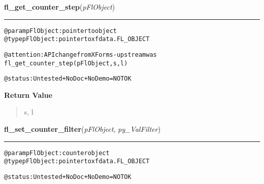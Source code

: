 \hspace{.8\funcindent}\begin{boxedminipage}{\funcwidth}

    \raggedright \textbf{fl\_get\_counter\_step}(\textit{pFlObject})

    \vspace{-1.5ex}

    \rule{\textwidth}{0.5\fboxrule}
\setlength{\parskip}{2ex}
\begin{alltt}
        @param pFlObject: pointer to object
@type pFlObject: pointer to xfdata.FL\_OBJECT

        @attention: API change from XForms - upstream was
                    fl\_get\_counter\_step(pFlObject, s, l)

        @status: Untested + NoDoc + NoDemo = NOT OK
    
\end{alltt}

\setlength{\parskip}{1ex}
      \textbf{Return Value}
    \vspace{-1ex}

      \begin{quote}
      s, l

      \end{quote}

    \end{boxedminipage}

    \label{xformslib:flcounter:fl_set_counter_filter}

    \vspace{0.5ex}

\hspace{.8\funcindent}\begin{boxedminipage}{\funcwidth}

    \raggedright \textbf{fl\_set\_counter\_filter}(\textit{pFlObject}, \textit{py\_ValFilter})

    \vspace{-1.5ex}

    \rule{\textwidth}{0.5\fboxrule}
\setlength{\parskip}{2ex}
\begin{alltt}
@param pFlObject: counter object
@type pFlObject: pointer to xfdata.FL\_OBJECT

    @status: Untested + NoDoc + NoDemo = NOT OK
\end{alltt}

\setlength{\parskip}{1ex}
    \end{boxedminipage}


